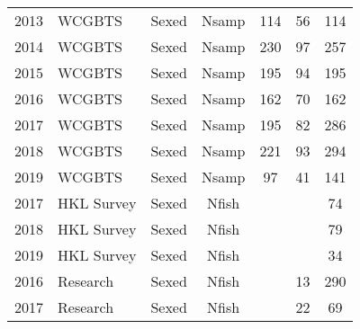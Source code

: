 \begin{longtable}[t]{c>{\centering\arraybackslash}p{3cm}ccccc}
2013 & WCGBTS & Sexed & Nsamp & 114 & 56 & 114\\
2014 & WCGBTS & Sexed & Nsamp & 230 & 97 & 257\\
2015 & WCGBTS & Sexed & Nsamp & 195 & 94 & 195\\
2016 & WCGBTS & Sexed & Nsamp & 162 & 70 & 162\\
2017 & WCGBTS & Sexed & Nsamp & 195 & 82 & 286\\
2018 & WCGBTS & Sexed & Nsamp & 221 & 93 & 294\\
2019 & WCGBTS & Sexed & Nsamp & 97 & 41 & 141\\
2017 & HKL Survey & Sexed & Nfish &  &  & 74\\
2018 & HKL Survey & Sexed & Nfish &  &  & 79\\
2019 & HKL Survey & Sexed & Nfish &  &  & 34\\
2016 & Research & Sexed & Nfish &  & 13 & 290\\
2017 & Research & Sexed & Nfish &  & 22 & 69\\*
\end{longtable}
\endgroup{}
\endgroup{}
